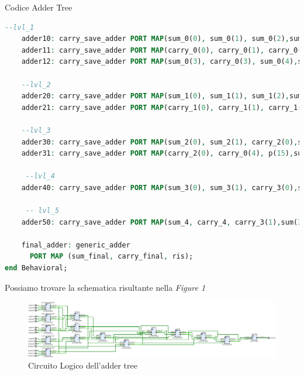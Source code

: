 \begin{problem}{Codice Adder Tree}{}
\begin{lstlisting}[language=VHDL]
    --lvl_1
    adder10: carry_save_adder PORT MAP(sum_0(0), sum_0(1), sum_0(2),sum(30 downto 0) => sum_1(0), sum(31) => garbage, carry(30 downto 0) => carry_1(0), carry(31) => garbage);
    adder11: carry_save_adder PORT MAP(carry_0(0), carry_0(1), carry_0(2),sum(30 downto 0) => sum_1(1), sum(31) => garbage, carry(30 downto 0) => carry_1(1), carry(31) => garbage);
    adder12: carry_save_adder PORT MAP(sum_0(3), carry_0(3), sum_0(4),sum(30 downto 0) => sum_1(2), sum(31) => garbage, carry(30 downto 0) => carry_1(2), carry(31) => garbage);
      
    --lvl_2 
    adder20: carry_save_adder PORT MAP(sum_1(0), sum_1(1), sum_1(2),sum(30 downto 0) => sum_2(0), sum(31) => garbage, carry(30 downto 0) => carry_2(0), carry(31) => garbage);
    adder21: carry_save_adder PORT MAP(carry_1(0), carry_1(1), carry_1(2),sum(30 downto 0) => sum_2(1), sum(31) => garbage, carry(30 downto 0) => carry_2(1), carry(31) => garbage);
    
    --lvl_3 
    adder30: carry_save_adder PORT MAP(sum_2(0), sum_2(1), carry_2(0),sum(30 downto 0) => sum_3(0), sum(31) => garbage, carry(30 downto 0) => carry_3(0), carry(31) => garbage);
    adder31: carry_save_adder PORT MAP(carry_2(0), carry_0(4), p(15),sum(30 downto 0) => sum_3(1), sum(31) => garbage, carry(30 downto 0) => carry_3(1), carry(31) => garbage);

     --lvl_4 
    adder40: carry_save_adder PORT MAP(sum_3(0), sum_3(1), carry_3(0),sum(30 downto 0) => sum_4, sum(31) => garbage, carry(30 downto 0) => carry_4, carry(31) => garbage);
 
     -- lvl_5
    adder50: carry_save_adder PORT MAP(sum_4, carry_4, carry_3(1),sum(30 downto 0) => sum_final, sum(31) => garbage, carry(30 downto 0) => carry_final, carry(31) => garbage);

    final_adder: generic_adder
      PORT MAP (sum_final, carry_final, ris);
end Behavioral;

\end{lstlisting}
\end{problem}

Possiamo trovare la schematica risultante nella \textit{Figure 1}
\begin{figure}[ht]
    \centering
    \includegraphics[width=15cm]{assets/schematics1.png}
    \caption{Circuito Logico dell'adder tree}
\end{figure}

